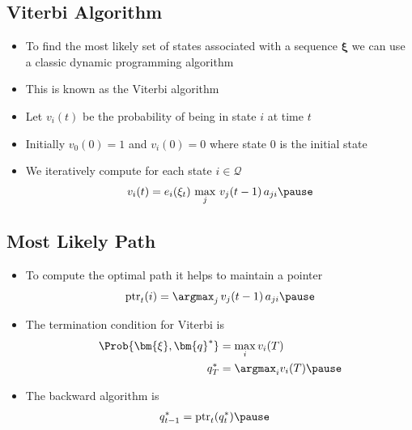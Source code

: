 \begin{slide}
\section[-1]{Viterbi Algorithm}

\begin{PauseHighLight}
  \begin{itemize}
  \item To find the most likely set of states associated with a sequence
    $\bm{\xi}$ we can use a classic dynamic programming algorithm\pause
  \item This is known as the Viterbi algorithm\pause
  \item Let $v_i(t)$ be the probability of being in state $i$ at time
    $t$\pause
  \item Initially $v_0(0)=1$ and $v_i(0)=0$ where state 0 is the initial
    state\pause 
  \item We iteratively compute for each state $i\in\mathcal{Q}$
    \begin{align*}
      v_i(t) = e_i(\xi_t)\, \max_j \, v_j(t-1)\, a_{ji}\pause
    \end{align*}
  \end{itemize}
\end{PauseHighLight}

\end{slide}


\begin{slide}
\section[-2]{Most Likely Path}

\begin{PauseHighLight}
  \begin{itemize}
  \item To compute the optimal path it helps to maintain a pointer
    \begin{align*}
      \mathrm{ptr}_t(i) = \argmax_j \, v_j(t-1)\, a_{ji}\pause
    \end{align*}
  \item The termination condition for Viterbi is
    \begin{align*}
      \Prob{\bm{\xi}, \bm{q}^*} &= \max_i v_i(T) \\
      q^*_T &= \argmax_i v_i(T)\pause
    \end{align*}
  \item The backward algorithm is
    \begin{align*}
      q^*_{t-1} &= \mathrm{ptr}_t(q^*_t)\pause
    \end{align*}
  \end{itemize}
\end{PauseHighLight}

\end{slide}

